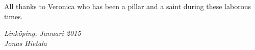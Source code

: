 \begin{acknowledgments}
  All thanks to Veronica who has been a pillar and a saint during these laborous times.

  \addvspace{1em}
  \begin{flushright}
    \textit{%
      Linköping, Januari 2015\\
      Jonas Hietala%
    }
  \end{flushright}
\end{acknowledgments}
